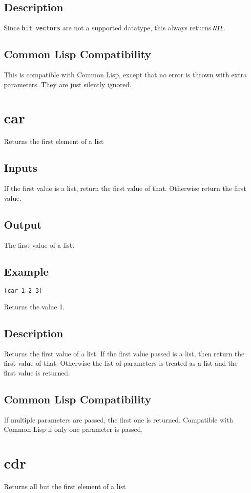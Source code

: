 \documentclass[10pt, openany]{book}
\newcommand{\constant}[1]{\emph{\texttt{#1}}}
\newcommand{\datatype}[1]{\texttt{#1}}
\newcommand{\cl}{Common Lisp}
\begin{document}
\subsection{Description}
Since \datatype{bit vectors} are not a supported datatype, this always returns \constant{NIL}.
\subsection{Common Lisp Compatibility}
This is compatible with \cl, except that no error is thrown with extra parameters.  They are just silently ignored.

\section{car}
Returns the first element of a list
\subsection{Inputs}
If the first value is a list, return the first value of that.  Otherwise return the first value.
\subsection{Output}
The first value of a list.
\subsection{Example}
\begin{lstlisting}
(car 1 2 3)
\end{lstlisting}
Returns the value 1.
\subsection{Description}
Returns the first value of a list.  If the first value passed is a list, then return the first value of that.  Otherwise the list of parameters is treated as a list and the first value is returned.
\subsection{Common Lisp Compatibility}
If multiple parameters are passed, the first one is returned.  Compatible with \cl{} if only one parameter is passed.

\section{cdr}
Returns all but the first element of a list
\end{document}
